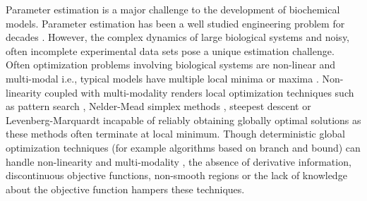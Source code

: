 \documentclass[12pt]{article}
\begin{document}
Parameter estimation is a major challenge to the development of biochemical models.
Parameter estimation has been a well studied engineering problem for decades \cite{nieman1971review,beck1977parameter,young1981parameter,beck1998inverse}.
However, the complex dynamics of large biological systems and noisy, often incomplete experimental data sets pose a unique estimation challenge.
Often optimization problems involving biological systems are non-linear and multi-modal i.e., typical models have multiple local minima or maxima \cite{moles2003parameter,banga2008optimization}.
Non-linearity coupled with multi-modality renders local optimization techniques such as pattern search \cite{hooke1961direct}, Nelder-Mead simplex methods \cite{nelder1965simplex}, steepest descent or Levenberg-Marquardt \cite{more1978levenberg} incapable of reliably obtaining globally optimal solutions as these methods often terminate at local minimum.
Though deterministic global optimization techniques (for example algorithms based on branch and bound) can handle non-linearity and multi-modality \cite{esposito2000deterministic,horst2013global},
the absence of derivative information, discontinuous objective functions, non-smooth regions or the lack of knowledge about the objective function hampers these techniques.

\end{document}
